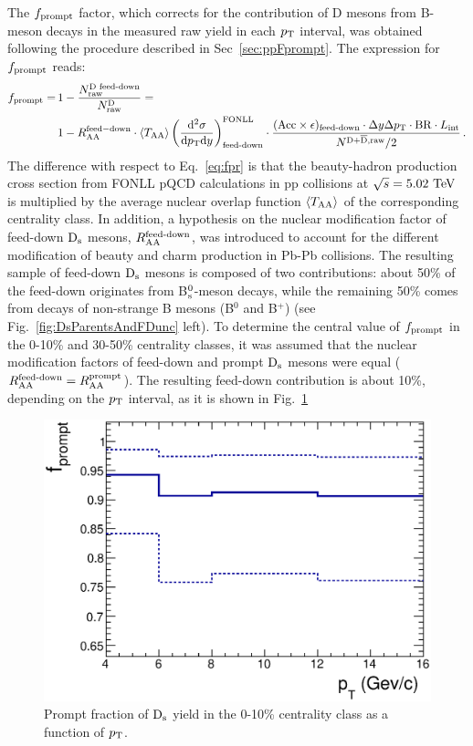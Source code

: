 The $f_{\rm prompt}$ factor, which corrects for the contribution of 
D mesons from B-meson decays in the measured raw yield 
in each $p_{\rm T}$ interval, was obtained following the procedure described in Sec~\ref{sec:ppFprompt}. 
The expression for $f_{\rm prompt}$ reads:
\begin{equation}
\label{eq:fprAA}
\begin{split}
f_{\mathrm{prompt}} = \, & 1- \frac{N^{\text{D~feed-down}}_{\mathrm{raw}}}{N^{\mathrm{D}}_{\mathrm{raw}}}=\\
& 1- R_{\rm AA} ^{\rm feed-down} \cdot  \langle T_{\rm AA} \rangle \left (\frac{\rm d^2 \sigma}{\mathrm dp_{\rm T} \mathrm d y} \right)^{\rm FONLL}_{\text{feed-down}} \cdot  \frac{(\mathrm{Acc} \times \epsilon)_\text{feed-down} \cdot \Delta y \Delta p_{\rm T} \cdot \mathrm{BR} \cdot L_{\rm int}}{N^{\rm D +\overline{D},raw}/2}\,.
\end{split}
\end{equation}
The difference with respect to Eq.~\ref{eq:fpr} is that the beauty-hadron 
production cross section from FONLL pQCD
calculations in pp collisions at $\sqrt{s}=5.02~\mathrm{TeV}$~\cite{Cacciari:2012ny}
is multiplied by the average nuclear overlap function $\langle T_{\rm AA} \rangle$ of the corresponding centrality class. 
In addition, a hypothesis on the nuclear 
modification factor of feed-down ${\rm D_s}$ mesons, $R_{\rm AA}^{\textnormal{feed-down}}$, was 
introduced to account for the different modification of beauty and charm 
production in Pb-Pb collisions. The resulting sample of 
feed-down ${\rm D_s}$ mesons is composed of two 
contributions: about 50\% of the feed-down originates from 
B$^0_{\rm s}$-meson decays, while the remaining 50\% comes from decays of 
non-strange B mesons (B$^0$ and B$^+$) (see Fig.~\ref{fig:DsParentsAndFDunc} left).
To determine the central value of $f_{\rm prompt}$ in the 0-10\% 
and 30-50\% centrality classes, it was assumed that the 
nuclear modification factors of feed-down and prompt ${\rm D_s}$ mesons were equal 
($R_{\rm AA}^{\textnormal{feed-down}}=R_{\rm AA}^{\rm prompt}$). 
The resulting feed-down contribution is about 10\%, depending on the
$p_{\rm T}$ interval, as it is shown in Fig.~\ref{fig:promptAA}
\begin{figure}[!htb]
 \begin{center}
\includegraphics[width=.54\textwidth]{./FigCap5/fprompt010.eps}
\end{center}
 \caption{Prompt fraction of ${\rm D_s}$ yield in the 0-10\% centrality class as a function of $p_{\rm T}$.}
 \label{fig:promptAA}
\end{figure}
